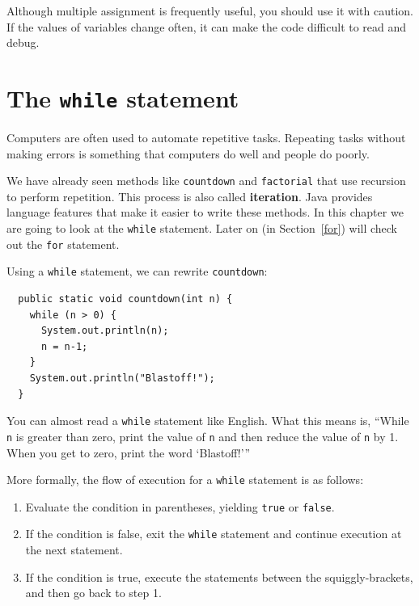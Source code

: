Although multiple assignment is frequently useful, you should use it
with caution.  If the values of variables change often, it can make
the code difficult to read and debug.


\section{The {\tt while} statement}

Computers are often used to automate repetitive tasks.  Repeating
tasks without making errors is something that
computers do well and people do poorly.

We have already seen methods like {\tt countdown} and {\tt factorial}
that use recursion to perform repetition. This process is also called
{\bf iteration}. Java provides language features that make
it easier to write these methods.
In this chapter we are going to look at the {\tt while} statement.
Later on (in Section~\ref{for}) will check out the {\tt for} statement.

Using a {\tt while} statement, we can rewrite {\tt countdown}:

\begin{lstlisting}
  public static void countdown(int n) {
    while (n > 0) {
      System.out.println(n);
      n = n-1;
    }
    System.out.println("Blastoff!");
  }
\end{lstlisting}
%
You can almost read a {\tt while} statement like
English.  What this means is, ``While {\tt n} is greater than
zero, print the value of {\tt n} and then reduce
the value of {\tt n} by 1.  When you get to zero, print the
word `Blastoff!'''

More formally, the flow of execution for a {\tt while} statement
is as follows:

\begin{enumerate}

\item Evaluate the condition in parentheses, yielding {\tt true}
or {\tt false}.

\item If the condition is false, exit the {\tt while} statement
and continue execution at the next statement.

\item If the condition is true, execute the statements
between the squiggly-brackets, and then go back to step 1.

\end{enumerate}

